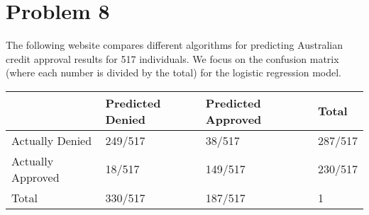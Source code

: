 \documentclass{article}
\begin{document}
\pagebreak

\section*{Problem 8}
The following website compares different algorithms for predicting Australian credit
approval results for 517 individuals. We focus on the confusion matrix (where each number is
divided by the total) for the logistic regression model.

\begin{tabular}{|l|l|l|l|}
    \hline
                      & Predicted Denied & Predicted Approved & Total   \\
    \hline
    Actually Denied   & 249/517          & 38/517             & 287/517 \\
    \hline
    Actually Approved & 18/517           & 149/517            & 230/517 \\
    \hline
    Total             & 330/517          & 187/517            & 1       \\
    \hline
\end{tabular}
\end{document}
